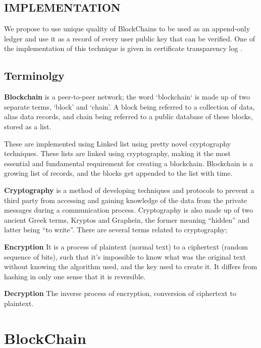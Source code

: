 \documentclass[BTech]{srmuthesis}
\begin{document}
\section{IMPLEMENTATION}
 We propose to use unique quality of BlockChains to be used as an append-only ledger and use it as a record of every user public key that can be verified. One of the implementation of this technique is given in certificate transparency log \citep{rfc9162}.
\section{Terminolgy}
 \textbf{Blockchain} is a peer-to-peer network; the word ‘blockchain‘ is made up of two separate terms, ‘block’ and ‘chain’. A block being referred to a collection of data, alias data records, and chain being referred to a public database of these blocks, stored as a list.

 These are implemented using Linked list using pretty novel cryptography techniques. These lists are linked using cryptography, making it the most essential and fundamental requirement for creating a blockchain. Blockchain is a growing list of records, and the blocks get appended to the list with time.

 \textbf{Cryptography} is a method of developing techniques and protocols to prevent a third party from accessing and gaining knowledge of the data from the private messages during a communication process. Cryptography is also made up of two ancient Greek terms, Kryptos and Graphein, the former meaning “hidden” and latter being “to write”. There are several terms related to cryptography;

 \textbf{Encryption}  It is a process of plaintext (normal text) to a ciphertext (random sequence of bits), such that it's impossible to know what was the original text without knowing the algorithm used, and the key used to create it. It differs from hashing in only one sense that it is reversible.

 \textbf{Decryption} The inverse process of encryption, conversion of ciphertext to plaintext.

 \chapter{BlockChain}
\end{document}
